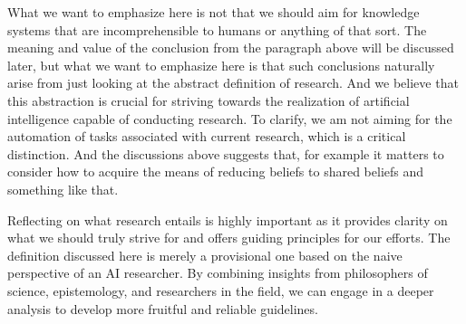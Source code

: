 \documentclass{book}
\begin{document}
What we want to emphasize here is not that we should aim for knowledge systems that are incomprehensible to humans or anything of that sort. The meaning and value of the conclusion from the paragraph above will be discussed later, but what we want to emphasize here is that such conclusions naturally arise from just looking at the abstract definition of research. And we believe that this abstraction is crucial for striving towards the realization of artificial intelligence capable of conducting research. To clarify, we am not aiming for the automation of tasks associated with current research, which is a critical distinction. And the discussions above suggests that, for example it matters to consider how to acquire the means of reducing beliefs to shared beliefs and something like that. 

Reflecting on what research entails is highly important as it provides clarity on what we should truly strive for and offers guiding principles for our efforts. The definition discussed here is merely a provisional one based on the naive perspective of an AI researcher. By combining insights from philosophers of science, epistemology, and researchers in the field, we can engage in a deeper analysis to develop more fruitful and reliable guidelines.


\end{document}
